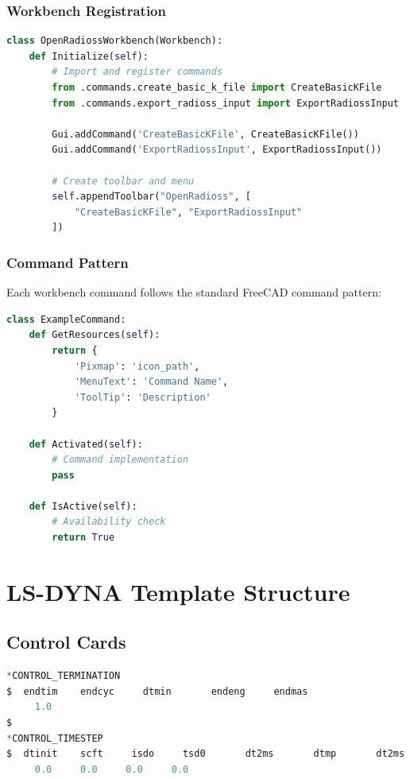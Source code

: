 \documentclass[12pt,a4paper]{article}
\begin{document}
\subsubsection{Workbench Registration}
\begin{lstlisting}[language=Python, caption=Workbench initialization]
class OpenRadiossWorkbench(Workbench):
    def Initialize(self):
        # Import and register commands
        from .commands.create_basic_k_file import CreateBasicKFile
        from .commands.export_radioss_input import ExportRadiossInput

        Gui.addCommand('CreateBasicKFile', CreateBasicKFile())
        Gui.addCommand('ExportRadiossInput', ExportRadiossInput())

        # Create toolbar and menu
        self.appendToolbar("OpenRadioss", [
            "CreateBasicKFile", "ExportRadiossInput"
        ])
\end{lstlisting}

\subsubsection{Command Pattern}
Each workbench command follows the standard FreeCAD command pattern:

\begin{lstlisting}[language=Python, caption=Command class structure]
class ExampleCommand:
    def GetResources(self):
        return {
            'Pixmap': 'icon_path',
            'MenuText': 'Command Name',
            'ToolTip': 'Description'
        }

    def Activated(self):
        # Command implementation
        pass

    def IsActive(self):
        # Availability check
        return True
\end{lstlisting}

\section{LS-DYNA Template Structure}

\subsection{Control Cards}
\begin{lstlisting}[language=Python, caption=Control card generation]
*CONTROL_TERMINATION
$  endtim    endcyc     dtmin       endeng     endmas
     1.0
$
*CONTROL_TIMESTEP
$  dtinit    scft     isdo     tsd0       dt2ms       dtmp       dt2ms
     0.0     0.0     0.0     0.0
\end{lstlisting}
\end{document}
